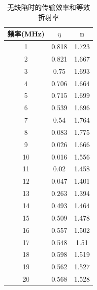 \documentclass[fleqn,10pt]{SelfArx} %
\begin{document}
\begin{table}[h]
	\centering
	\begin{tabular}{|c|c|c|}
	\hline
	频率(MHz) & $\eta$ & n     \\ \hline
	1       & 0.818  & 1.723 \\ \hline
	2       & 0.821  & 1.667 \\ \hline
	3       & 0.75   & 1.693 \\ \hline
	4       & 0.706  & 1.664 \\ \hline
	5       & 0.715  & 1.699 \\ \hline
	6       & 0.539  & 1.696 \\ \hline
	7       & 0.54   & 1.764 \\ \hline
	8       & 0.083  & 1.775 \\ \hline
	9       & 0.026  & 1.666 \\ \hline
	10      & 0.016  & 1.556 \\ \hline
	11      & 0.02   & 1.458 \\ \hline
	12      & 0.047  & 1.401 \\ \hline
	13      & 0.263  & 1.394 \\ \hline
	14      & 0.493  & 1.464 \\ \hline
	15      & 0.509  & 1.478 \\ \hline
	16      & 0.557  & 1.502 \\ \hline
	17      & 0.548  & 1.51  \\ \hline
	18      & 0.598  & 1.519 \\ \hline
	19      & 0.562  & 1.527 \\ \hline
	20      & 0.568  & 1.528 \\ \hline
	\end{tabular}
	\caption{无缺陷时的传输效率和等效折射率}
	\label{tab:app2}
\end{table}
\end{document}
